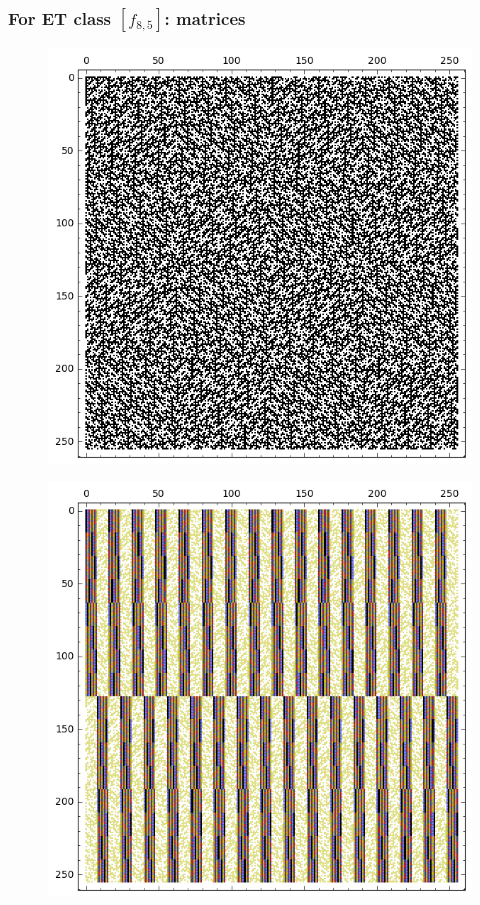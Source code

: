\documentclass[pdf,sprung,slideColor,nocolorBG]{beamer}
\newenvironment{colortheme}[1]{
\def\ProvidesPackageRCS $##1${\relax}
\renewcommand{\ProcessOptions}{\relax}
\makeatletter

\makeatother
}{}
\begin{document}
\begin{colortheme}{jubata}
\begin{frame}
\begin{figure}
\begin{minipage}{.48\textwidth}
  \label{fig:8_4_bent_cayley_graph_index_matrix}
\end{minipage}
\end{figure}
~
\end{frame}
\begin{frame}
\frametitle{For ET class $[f_{8,5}]$: matrices}
\begin{figure}
\centering
\begin{minipage}{.48\textwidth}
  \centering
  \includegraphics[width=.9\linewidth]{../matrix_plot/c8_5_weight_class_matrix.png}
  \label{fig:8_5_weight_class_matrix}
\end{minipage}%
\begin{minipage}{.48\textwidth}
  \centering
  \includegraphics[width=.9\linewidth]{../matrix_plot/c8_5_bent_cayley_graph_index_matrix.png}

\end{minipage}
\end{figure}
\end{frame}
\end{colortheme}
\end{document}
